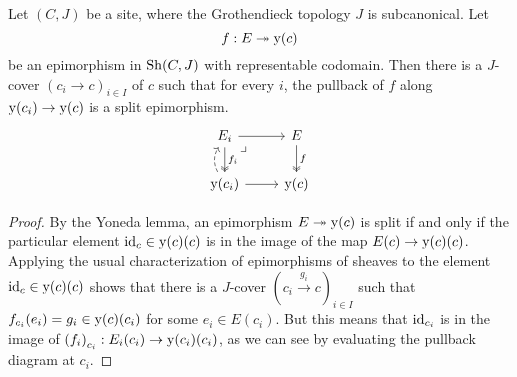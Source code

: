 \begin{lemma}
  Let $(C, J)$ be a site,
  where the Grothendieck topology $J$ is subcanonical.
  Let
  \[ f : E \twoheadrightarrow \mathrm{y}(c) \]
  be an epimorphism in $\mathrm{Sh}(C, J)$ with representable codomain.
  Then there is a $J$-cover $(c_i \to c)_{i \in I}$ of $c$
  such that for every $i$,
  the pullback of $f$ along $\mathrm{y}(c_i) \to \mathrm{y}(c)$
  is a split epimorphism.
  \[ \begin{tikzcd}
    E_i \ar[r] \ar[d, two heads, "f_i"] \ar[dr, phantom, very near start, "\lrcorner"] &
    E \ar[d, two heads, "f"] \\
    \yo(c_i) \ar[r] \ar[u, bend left, dashed]&
    \yo(c)
  \end{tikzcd} \]
\end{lemma}

\begin{proof}
  By the Yoneda lemma,
  an epimorphism $E \twoheadrightarrow \mathrm{y}(c)$ is split
  if and only if
  the particular element $\mathrm{id}_c \in \mathrm{y}(c)(c)$
  is in the image of the map $E(c) \to \mathrm{y}(c)(c)$.
  Applying the usual characterization of epimorphisms of sheaves
  \cite[Corollary III.7.5]{MaclaneMoerdjik}
  to the element $\mathrm{id}_c \in \mathrm{y}(c)(c)$
  shows that there is a $J$-cover ${(c_i \xrightarrow{g_i} c)}_{i \in I}$
  such that $f_{c_i}(e_i) = g_i \in \mathrm{y}(c)(c_i)$
  for some $e_i \in E(c_i)$.
  But this means that $\mathrm{id}_{c_i}$ is in the image of ${(f_i)}_{c_i} : E_i(c_i) \to \mathrm{y}(c_i)(c_i)$,
  as we can see by evaluating the pullback diagram at $c_i$.
\end{proof}
